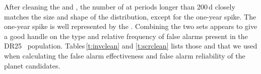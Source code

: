 After cleaning the  and , the number of  at periods longer than 200\,d closely matches the size and shape of the \opstce{} distribution, except for the one-year spike. The one-year spike is well represented by the .  Combining the two sets appears to give a good handle on the type and relative frequency of false alarms present in the DR25 \opstce\ population. Tables\,\ref{t:invclean} and \ref{t:scrclean} lists those  and  that we used when calculating the false alarm effectiveness and false alarm reliability of the planet candidates.


